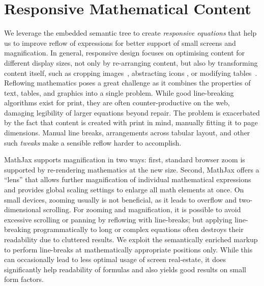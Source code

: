 \documentclass[conference]{IEEEtran}
\begin{document}
\section{Responsive Mathematical Content}
\label{sec:responsive-equations}

We leverage the embedded semantic tree to create \emph{responsive
equations} that help us to improve reflow of expressions for better support of
small screens and magnification. In general, responsive design focuses on
optimising content for different display sizes, not only by re-arranging
content, but also by transforming content itself, such as cropping
images~\cite{web1}, abstracting icons \cite{smashSvg}, or modifying
tables~\cite{zurbTable}. Reflowing mathematics poses a great challenge
as it combines the properties of text, tables, and graphics into a single
problem. While good line-breaking algorithms exist for print, they are often
counter-productive on the web, damaging legibility of larger equations beyond
repair. The problem is exacerbated by the fact that content is created with
print in mind, manually fitting it to page dimensions. Manual line breaks,
arrangements across tabular layout, and other such \emph{tweaks} make a sensible
reflow harder to accomplish.

MathJax supports magnification in two ways: first, standard browser zoom is
supported by re-rendering mathematics at the new size. Second, MathJax
offers a ``lens'' that allows further magnification of individual mathematical expressions
and provides global scaling settings to enlarge all math elements
at once. On small devices, zooming usually is not beneficial, as it leads to
overflow and two-dimensional scrolling.
For zooming and magnification, it is possible to avoid 
excessive scrolling or panning by reflowing with line-breaks; but
applying line-breaking programmatically to long or complex equations 
often destroys their readability due to
cluttered results. We exploit the semantically enriched markup to perform
line-breaks at mathematically appropriate positions only. While this can
occasionally lead to less optimal usage of screen real-estate, it does
significantly help readability of formulas and also yields good results on small
form factors.
\end{document}
